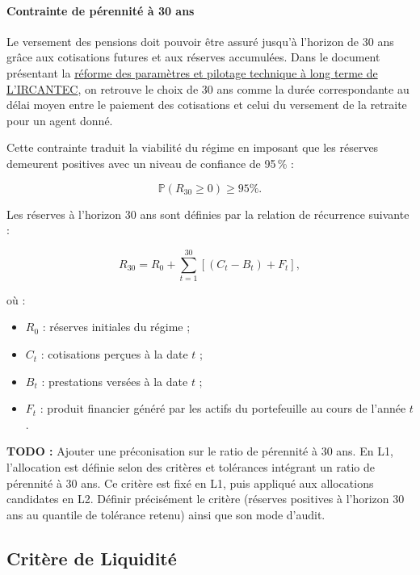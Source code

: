 \documentclass[11pt,a4paper]{article}
\begin{document}
\paragraph{Contrainte de pérennité à 30 ans}

Le versement des pensions doit pouvoir être assuré jusqu'à l'horizon de 30 ans grâce aux cotisations futures et aux réserves accumulées. 
Dans le document présentant la \href{https://www.cor-retraites.fr/sites/default/files/2019-06/doc-1083.pdf}{\textcolor{nexnavy}{réforme des paramètres et pilotage technique à long terme de L’IRCANTEC}}, on retrouve le choix de 30 ans comme la durée correspondante au délai moyen entre le paiement des cotisations et celui du versement de la retraite pour un agent donné.

Cette contrainte traduit la viabilité du régime en imposant que les réserves demeurent positives avec un niveau de confiance de 95\,\% :

\begin{equation}
\mathbb{P}\left(R_{30} \geq 0\right) \geq 95\%.
\end{equation}

Les réserves à l'horizon 30 ans sont définies par la relation de récurrence suivante :

\begin{equation}
R_{30}
=
R_0
+
\sum_{t=1}^{30}
\left[
\left(C_t - B_t\right)
+
F_t
\right],
\end{equation}

où :
\begin{itemize}[label=\textbullet]
    \item $R_0$ : réserves initiales du régime ;
    \item $C_t$ : cotisations perçues à la date $t$ ;
    \item $B_t$ : prestations versées à la date $t$ ;
    \item $F_t$ : produit financier généré par les actifs du portefeuille au cours de l'année $t$.
\end{itemize}

{\color{red}\textbf{TODO :} Ajouter une préconisation sur le ratio de pérennité à 30 ans. En L1, l'allocation est définie selon des critères et tolérances intégrant un ratio de pérennité à 30 ans. Ce critère est fixé en L1, puis appliqué aux allocations candidates en L2. Définir précisément le critère (réserves positives à l'horizon 30 ans au quantile de tolérance retenu) ainsi que son mode d'audit.}

\subsection{Critère de Liquidité}
\end{document}
